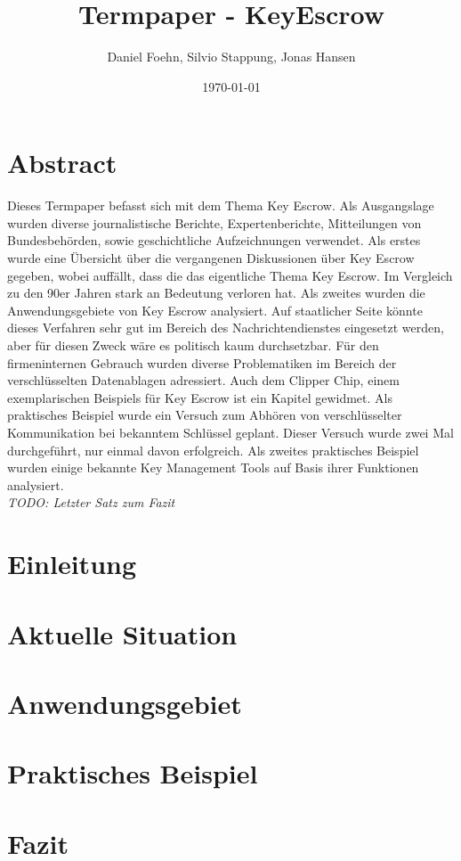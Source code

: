 \documentclass[a4paper, 10pt, fleqn]{article}
\title{Termpaper - KeyEscrow}
\author{Daniel Foehn, Silvio Stappung, Jonas Hansen}
\date{\today} %
\newcommand*{\titleGM}{\begingroup %
\hbox{ %
\hspace*{0.2\textwidth} %
\rule{1pt}{\textheight} %
\hspace*{0.05\textwidth} %
\parbox[b]{0.75\textwidth}{ %

{\noindent\Huge\bfseries Termpaper \\[0.5\baselineskip] Key Escrow}\\[2\baselineskip] %
{\large \textit{HSLU Modul - Network \& Cloud Services}}\\[4\baselineskip] %
{\Large \textsc{Daniel Föhn, Jonas Hansen \\[0.5\baselineskip] und Silvio Stappung}} %

\vspace{0.5\textheight} %
{\noindent \today}\\[\baselineskip] %
}}
\endgroup}
\begin{document}
\begin{titlepage}
	\titleGM
	\thispagestyle{empty}
\end{titlepage}

\tableofcontents
\listoffigures
\clearpage

\section*{Abstract}
Dieses Termpaper befasst sich mit dem Thema Key Escrow. Als Ausgangslage wurden diverse journalistische Berichte, Expertenberichte, Mitteilungen von Bundesbehörden, sowie geschichtliche Aufzeichnungen verwendet. Als erstes wurde eine Übersicht über die vergangenen Diskussionen über Key Escrow gegeben, wobei auffällt, dass die das eigentliche Thema Key Escrow. Im Vergleich zu den 90er Jahren stark an Bedeutung verloren hat. Als zweites wurden die Anwendungsgebiete von Key Escrow analysiert. Auf staatlicher Seite könnte dieses Verfahren sehr gut im Bereich des Nachrichtendienstes eingesetzt werden, aber für diesen Zweck wäre es politisch kaum durchsetzbar. Für den firmeninternen Gebrauch wurden diverse Problematiken im Bereich der verschlüsselten Datenablagen adressiert. Auch dem Clipper Chip, einem exemplarischen Beispiels für Key Escrow ist ein Kapitel gewidmet. Als praktisches Beispiel wurde ein Versuch zum Abhören von verschlüsselter Kommunikation bei bekanntem Schlüssel geplant. Dieser Versuch wurde zwei Mal durchgeführt, nur einmal davon erfolgreich. Als zweites praktisches Beispiel wurden einige bekannte Key Management Tools auf Basis ihrer Funktionen analysiert.
\\ \large{\textit{TODO: Letzter Satz zum Fazit}}
\clearpage
\section{Einleitung}
	

\clearpage
\section{Aktuelle Situation}
	

\clearpage
\section{Anwendungsgebiet}
	

\clearpage
\section{Praktisches Beispiel}
	 

\clearpage
\section{Fazit}
	

\nocite{*}
\clearpage


\end{document}
